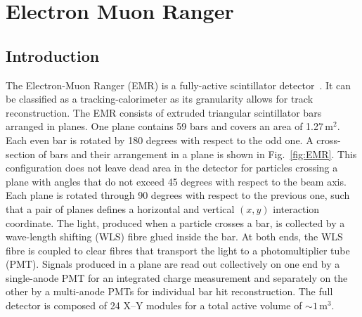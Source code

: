 \graphicspath{{05-EMR/Figures/}}

\section{Electron Muon Ranger}
\label{Sect:EMR}

\subsection{Introduction}
\label{SubSect:EMR_Intro}

The Electron-Muon Ranger (EMR) is a fully-active scintillator detector~\cite{2016JInst..11T10007}. It can be classified as a tracking-calorimeter as its granularity allows for track reconstruction. The EMR consists of extruded triangular scintillator bars arranged in planes. One plane contains 59 bars and covers an area of 1.27\,m$^2$. Each even bar is rotated by 180 degrees with respect to the odd one. A cross-section of bars and their arrangement in a plane is shown in Fig.~\ref{fig:EMR}. This configuration does not leave dead area in the detector for particles crossing a plane with angles that do not exceed 45 degrees with respect to the beam axis. Each plane is rotated through 90 degrees with respect to the previous one, such that a pair of planes defines a horizontal and vertical $(x, y)$ interaction coordinate. The light, produced when a particle crosses a bar, is collected by a wave-length shifting (WLS) fibre glued inside the bar. At both ends, the WLS fibre is coupled to clear fibres that transport the light to a photomultiplier tube (PMT). Signals produced in a plane are read out collectively on one end by a single-anode PMT for an integrated charge measurement and separately on the other by a multi-anode PMTs for individual bar hit reconstruction. The full detector is composed of 24 X--Y modules for a total active volume of $\sim 1$\,m$^3$.

